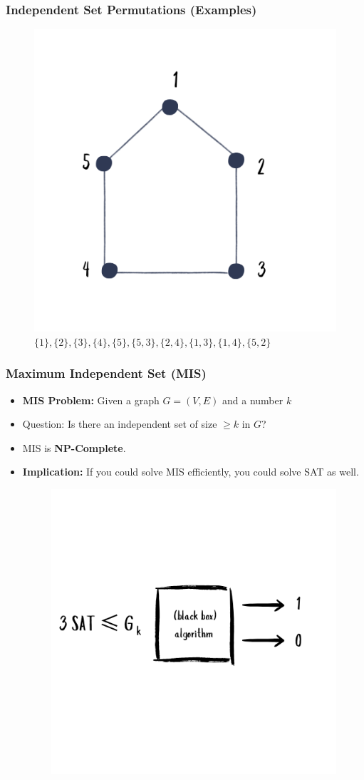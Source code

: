 \documentclass[10pt,aspectratio=43]{beamer}
\begin{document}
\begin{frame}
  \frametitle{Independent Set Permutations (Examples)}
  
  \begin{figure}
    \centering
    \includegraphics[width=0.4\linewidth]{figures/lec/i3.png}
    \caption {$\{1\}, \{2\}, \{3\}, \{4\}, \{5\}, \{5,3\}, \{2,4\}, \{1,3\}, \{1,4\}, \{5,2\}$}
  \end{figure}
\end{frame}

\begin{frame}
    \frametitle{Maximum Independent Set (MIS)}
    \begin{itemize}
        \item \textbf{MIS Problem:} Given a graph $G = (V, E)$ and a number $k$
        \item Question: Is there an independent set of size $\geq k$ in $G$?
        \item MIS is \textbf{NP-Complete}.
        \item \textbf{Implication:} If you could solve MIS efficiently, you could solve SAT as well.
 \begin{figure}
    \centering
    \includegraphics[width=0.4\linewidth]{figures/lec/MIS.png}
  \end{figure}
    \end{itemize}
\end{frame}
\end{document}
